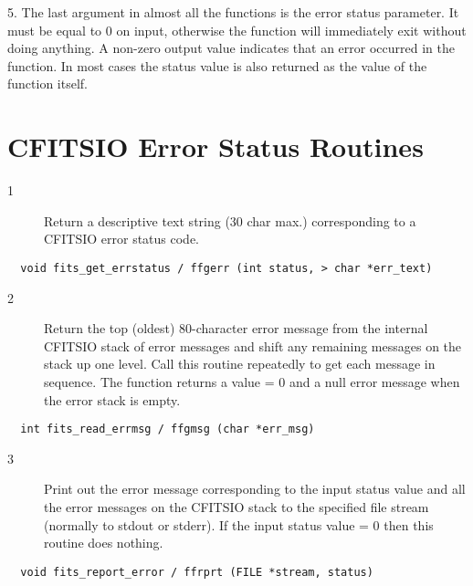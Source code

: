 \documentclass[11pt]{book}
\begin{document}
5.  The last argument in almost all the functions is the error status
parameter.  It must be equal to 0 on input, otherwise the function will
immediately exit without doing anything.  A non-zero output value
indicates that an error occurred in the function.  In most cases the
status value is also returned as the value of the function itself.


\section{CFITSIO Error Status Routines}


\begin{description}
\item[1 ] Return a descriptive text string (30 char max.) corresponding to
   a CFITSIO error status code.\label{ffgerr}
\end{description}

\begin{verbatim}
  void fits_get_errstatus / ffgerr (int status, > char *err_text)
\end{verbatim}

\begin{description}
\item[2 ] Return the top (oldest) 80-character error message from the
    internal CFITSIO stack of error messages and shift any remaining
    messages on the stack up one level.  Call this routine
    repeatedly to get each message in sequence.  The function returns
   a value = 0 and a null error message when the error stack is empty.
\label{ffgmsg}
\end{description}

\begin{verbatim}
  int fits_read_errmsg / ffgmsg (char *err_msg)
\end{verbatim}

\begin{description}
\item[3 ] Print out the error message corresponding to the input status
    value and all the error messages on the CFITSIO stack to the specified
    file stream  (normally to stdout or stderr).  If the input
    status value = 0 then this routine does nothing.
\label{ffrprt}
\end{description}

\begin{verbatim}
  void fits_report_error / ffrprt (FILE *stream, status)
\end{verbatim}
\end{document}
